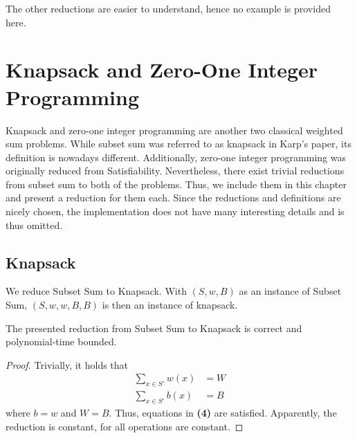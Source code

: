 The other reductions are easier to understand, hence no example is provided here.

\section{Knapsack and Zero-One Integer Programming}
Knapsack and zero-one integer programming are another two classical weighted sum problems. While subset sum was referred 
to as knapsack in Karp's paper, its definition is nowadays different. Additionally, zero-one integer programming 
was originally reduced from Satisfiability. Nevertheless, there exist trivial reductions from subset sum to both of the problems. Thus, 
we include them in this chapter and present a reduction for them each. 
Since the reductions and definitions are nicely chosen, the implementation does not have 
many interesting details and is thus omitted. 

\subsection{Knapsack}
We reduce Subset Sum to Knapsack. With $(S, w, B)$ as an instance of Subset Sum, $(S, w, w, B, B)$
is then an instance of knapsack.
\begin{theorem}
    The presented reduction from Subset Sum to Knapsack is correct and polynomial-time bounded.
\end{theorem}
\begin{proof}
    Trivially, it holds that 
    \begin{align*}
        \sum_{x \in S'} w(x) &= W \\ 
        \sum_{x \in S'} b(x) &= B
    \end{align*}
    where $b = w$ and $W = B$. Thus, equations in \textbf{(4)} are satisfied.
    Apparently, the reduction is constant, for all operations are constant. 
\end{proof}

